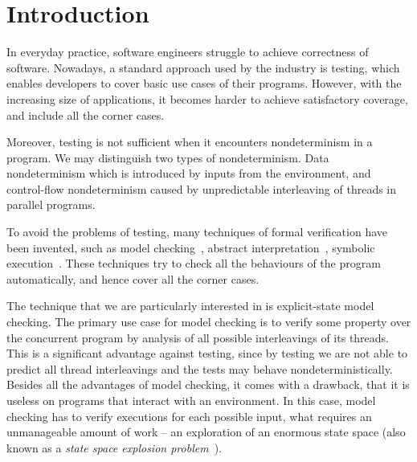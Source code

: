 \chapter{Introduction}\label{ch:Introduction}


\noindent

In everyday practice, software engineers struggle to achieve correctness of
software. Nowadays, a standard approach used by the industry is testing, which
enables developers to cover basic use cases of their programs. However, with the
increasing size of applications, it becomes harder to achieve satisfactory
coverage, and include all the corner cases.

Moreover, testing is not sufficient when it encounters nondeterminism in a
program. We may distinguish two types of nondeterminism. Data nondeterminism
which is introduced by inputs from the environment, and control-flow
nondeterminism caused by unpredictable interleaving of threads in parallel
programs.

To avoid the problems of testing, many techniques of formal verification have
been invented, such as model checking~\cite{Baier08}, abstract
interpretation~\cite{Cousot14}, symbolic execution~\cite{King76}. These
techniques try to check all the behaviours of the program automatically, and
hence cover all the corner cases.

The technique that we are particularly interested in is explicit-state model
checking. The primary use case for model checking is to
verify some property over the concurrent program by analysis of all
possible interleavings of its threads. This is a significant advantage
against testing, since by testing we are not able to predict all thread
interleavings and the tests may behave nondeterministically. Besides all
the advantages of model checking, it comes with a drawback, that it is
useless on programs that interact with an environment. In this case,
model checking has to verify executions for each possible input, what
requires an unmanageable amount of work -- an exploration of an enormous
state space (also known as a \emph{state space explosion
problem}~\cite{Clarke99}).

